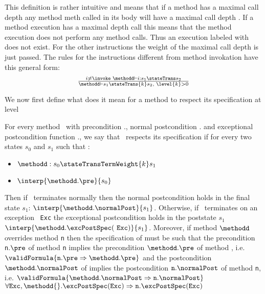 This definition is rather intuitive and means that if a method \methodd{}
 has a maximal call depth  any method \mbox{\rm meth}  called in its body will have a maximal call depth . 
If a method execution has a maximal depth call  this means that the method execution does not perform any method calls.
Thus an execution labeled with  does not exist.
 For the other instructions the weight of the maximal call depth is just passed. The rules for the instructions different from 
method invokation have this general form: 
$$ \begin{array}{l}
              {\scriptsize \frac{ i \neq \invoke \  \methodd \vdash  i: s_1 \stateTrans s_2 }{ \methodd \vdash s_1 \stateTrans{k} s_2 , \  \level{k} > 0}}
\end{array}$$
 
We now first define what does it mean for a method to respect its specification at level 
\begin{defCorrect} \label{defCorrectLevel}
For every method \methodd \ with precondition \methodd.\pre, normal postcondition \methodd.\normalPost
and exceptional postcondition function \methodd.\excPostSpec, we say that \methodd \ respects its specification if 
for every two states $s_0$ and $s_1$ such that :
\begin{itemize}
      
      \item   $\methodd : s_0  \stateTransTermWeight{k} s_1   $
      \item   $ \interp{\methodd.\pre }{ s_0 }$
\end{itemize}
Then if \methodd \ terminates normally then the normal postcondition holds in the final state $s_1 $:  $\interp{\methodd.\normalPost}{s_1}$. 
Otherwise, if  \methodd \ terminates on an exception \mbox{ \rm \texttt{Exc}} the exceptional postcondition holds in the poststate $s_1 $
$ \interp{\methodd.\excPostSpec(  \mbox{ \rm \texttt{Exc}} )}{s_1} $.
 Moreover, if method $\methodd$ overrides method \mbox{\rm\texttt{n}} then the specification of \methodd{} must be such that
 the precondition \mbox{\rm\texttt{n}}.$\pre$ of method  \mbox{\rm\texttt{n}} implies the precondition  $\methodd.\pre$ of method \methodd{}, i.e.
$\validFormula{\mbox{\rm\texttt{n}}.\pre \Rightarrow   \methodd.\pre}$  
and the postcondition 
$\methodd.\normalPost$ of \methodd{} implies the postcondition $\mbox{\rm\texttt{n}}.\normalPost$   of method \mbox{\rm\texttt{n}}, i.e. 
$\validFormula{\methodd.\normalPost \Rightarrow \mbox{\rm\texttt{n}}.\normalPost } $
 $\forall \mbox{\rm\texttt{Exc}} , \methodd{}.\excPostSpec(\mbox{\rm\texttt{Exc}}  )    \Rightarrow \mbox{\rm\texttt{n}}.\excPostSpec(\mbox{\rm\texttt{Exc}}  )$
\end{defCorrect}

